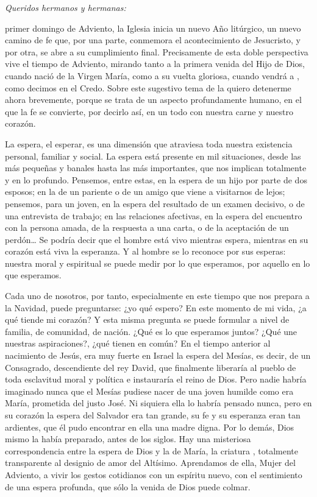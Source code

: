 \begin{body}
	\emph{Queridos hermanos y hermanas:} 
	
	 primer domingo de Adviento, la Iglesia inicia un nuevo Año litúrgico, un nuevo camino de fe que, por una parte, conmemora el acontecimiento de Jesucristo, y por otra, se abre a su cumplimiento final. Precisamente de esta doble perspectiva vive el tiempo de Adviento, mirando tanto a la primera venida del Hijo de Dios, cuando nació de la Virgen María, como a su vuelta gloriosa, cuando vendrá a , como decimos en el Credo. Sobre este sugestivo tema de la  quiero detenerme ahora brevemente, porque se trata de un aspecto profundamente humano, en el que la fe se convierte, por decirlo así, en un todo con nuestra carne y nuestro corazón. 
	
	La espera, el esperar, es una dimensión que atraviesa toda nuestra existencia personal, familiar y social. La espera está presente en mil situaciones, desde las más pequeñas y banales hasta las más importantes, que nos implican totalmente y en lo profundo. Pensemos, entre estas, en la espera de un hijo por parte de dos esposos; en la de un pariente o de un amigo que viene a visitarnos de lejos; pensemos, para un joven, en la espera del resultado de un examen decisivo, o de una entrevista de trabajo; en las relaciones afectivas, en la espera del encuentro con la persona amada, de la respuesta a una carta, o de la aceptación de un perdón\ldots{} Se podría decir que el hombre está vivo mientras espera, mientras en su corazón está viva la esperanza. Y al hombre se lo reconoce por sus esperas: nuestra  moral y espiritual se puede medir por lo que esperamos, por aquello en lo que esperamos. 
	
	Cada uno de nosotros, por tanto, especialmente en este tiempo que nos prepara a la Navidad, puede preguntarse: ¿yo qué espero? En este momento de mi vida, ¿a qué tiende mi corazón? Y esta misma pregunta se puede formular a nivel de familia, de comunidad, de nación. ¿Qué es lo que esperamos juntos? ¿Qué une nuestras aspiraciones?, ¿qué tienen en común? En el tiempo anterior al nacimiento de Jesús, era muy fuerte en Israel la espera del Mesías, es decir, de un Consagrado, descendiente del rey David, que finalmente liberaría al pueblo de toda esclavitud moral y política e instauraría el reino de Dios. Pero nadie habría imaginado nunca que el Mesías pudiese nacer de una joven humilde como era María, prometida del justo José. Ni siquiera ella lo habría pensado nunca, pero en su corazón la espera del Salvador era tan grande, su fe y su esperanza eran tan ardientes, que él pudo encontrar en ella una madre digna. Por lo demás, Dios mismo la había preparado, antes de los siglos. Hay una misteriosa correspondencia entre la espera de Dios y la de María, la criatura , totalmente transparente al designio de amor del Altísimo. Aprendamos de ella, Mujer del Adviento, a vivir los gestos cotidianos con un espíritu nuevo, con el sentimiento de una espera profunda, que sólo la venida de Dios puede colmar.
\end{body}	

